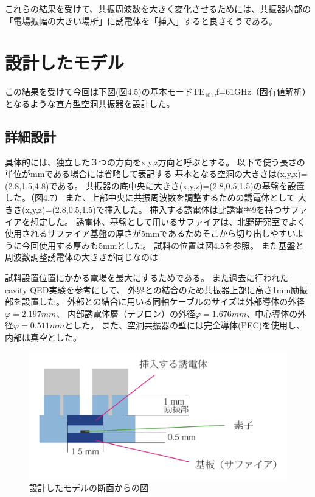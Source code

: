 これらの結果を受けて、共振周波数を大きく変化させるためには、共振器内部の「電場振幅の大きい場所」に誘電体を「挿入」すると良さそうである。

\section{設計したモデル}
この結果を受けて今回は下図(図4.5)の基本モードTE$_{101}$,f=61GHz（固有値解析）となるような直方型空洞共振器を設計した。

\subsection*{詳細設計}
具体的には、独立した３つの方向をx,y,z方向と呼ぶとする。
以下で使う長さの単位がmmである場合には省略して表記する
基本となる空洞の大きさは(x,y,x)=(2.8,1.5,4.8)である。
共振器の底中央に大きさ(x,y,z)=(2.8,0.5,1.5)の基盤を設置した。（図4.7）
また、上部中央に共振周波数を調整するための誘電体として
大きさ(x,y,z)=(2.8,0.5,1.5)で挿入した。
挿入する誘電体は比誘電率9を持つサファイアを想定した。
誘電体、基盤として用いるサファイアは、北野研究室でよく使用されるサファイア基盤の厚さが5mmであるためそこから切り出しやすいように今回使用する厚みも5mmとした。
試料の位置は図4.5を参照。
また基盤と周波数調整誘電体の大きさが同じなのは

試料設置位置にかかる電場を最大にするためである。
また過去に行われたcavity-QED実験\cite{cQED}を参考にして、
外界との結合のため共振器上部に高さ1mm励振部を設置した。
外部との結合に用いる同軸ケーブルのサイズは外部導体の外径$φ=2.197mm$、
内部誘電体層（テフロン）の外径$φ=1.676mm$、中心導体の外径$φ=0.511mm$とした。
また、空洞共振器の壁には完全導体(PEC)を使用し、内部は真空とした。

\vspace{10 mm}

\begin{figure}[h]
  \begin{center}
    \includegraphics[width=12cm]{./image/newmodel.png}
    \caption{設計したモデルの断面からの図}
    \label{fig:Cavity}
  \end{center}
\end{figure}

